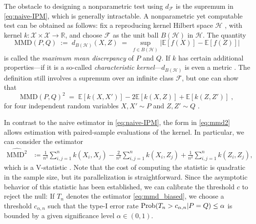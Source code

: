 \documentclass{article}
\begin{document}
The obstacle to designing a nonparametric test using $d_\mathcal{F}$
is the supremum in \eqref{eq:naive-IPM}, which is generally intractable. 
A nonparametric yet computable test
can be obtained as follows: fix a reproducing kernel
Hilbert space $\mathcal{H}$ \cite[see e.g.,][Definition 4.18]{steinwart_support_2008}, with kernel
${k:\mathcal{X}\times\mathcal{X}\rightarrow\mathbb{R}}$, and 
choose $\mathcal{F}$ as the unit ball ${B(\mathcal{H})}$ in $\mathcal{H}$.
The quantity
\begin{equation*}
  \mathrm{MMD}(P,Q)
  \;:=\;
  d_{B(\mathcal{H})}(X,Z)
  \;=\;
  \sup_{f\in B(\mathcal{H})}|\mathbb{E}[f(X)]-\mathbb{E}[f(Z)]|
\end{equation*}
is called the \emph{maximum mean discrepancy} of $P$ and $Q$.
If $k$ has certain additional properties---if it is a
so-called \emph{characteristic kernel}---$d_{B(\mathcal{H})}$ is even
a metric \citep{fukumizu_kernel_2007, sriperumbudur_universality_2011}.
The definition still involves a supremum over an infinite class
$\mathcal{F}$, but one can show that
\begin{equation}
  \mathrm{MMD}(P,Q)^2\;=\;\mathbb{E}[k(X,X')]-2\mathbb{E}[k(X,Z)]+\mathbb{E}[k(Z,Z')]\;,\label{eq:mmd2}
\end{equation}
for four independent random variables ${X,X'\sim P}$ and ${Z,Z'\sim
  Q}$ \citep{gretton_kernel_2012}.


  
In contrast to the naive estimator in \eqref{eq:naive-IPM}, the form in \eqref{eq:mmd2} allows estimation with paired-sample evaluations of the kernel. 
In particular, we can consider the estimator 
\begin{align}
        \widehat{\mathrm{MMD}^2} &\coloneqq \frac{1}{n^2}  \sum_{i,j=1}^n k\left(X_{i}, X_{j}\right)
        -\frac{2}{n^2} \sum_{i,j=1}^{n} k\left(X_{i}, Z_{j}\right)+\frac{1}{n^2}\sum_{i,j=1}^{n} k\left(Z_{i}, Z_{j}\right), \label{eq:mmd_biased}
\end{align}
which is a V-statistic \citep{Vaart_1998,Mises1947asymptotic}. Note that the cost of computing the statistic is quadratic in the sample size, but its parallelization is straightforward. 
Since the asymptotic behavior of this statistic has been established, we can calibrate the threshold $c$ to reject the null:
If $T_n$ denotes the estimator \eqref{eq:mmd_biased}, we choose a threshold $c_{\alpha, n}$ such that the type-I error rate $\mathrm{Prob} (T_n > c_{\alpha, n}\vert P=Q)\leq \alpha$ is bounded by a given significance level $\alpha \in (0,1)$.
\end{document}
